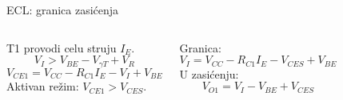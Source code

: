 \begin{frame}[label=10-s085]{ECL: granica zasićenja}
\setlength{\abovedisplayskip}{4pt}\setlength{\belowdisplayskip}{4pt}\setlength{\abovedisplayshortskip}{3pt}\setlength{\belowdisplayshortskip}{3pt}
\begin{columns}[T,onlytextwidth]\centering \raggedright T1 provodi celu struju $I_E$.
\[V_I>V_{BE}-V_{\gamma T}+V_R\]
\[V_{CE1}=V_{CC}-R_{C1}I_E-V_I+V_{BE}\]
Aktivan režim: $V_{CE1}>V_{CES}$.\par\medskip
Granica:
\[V_I=V_{CC}-R_{C1}I_E-V_{CES}+V_{BE}\]
U zasićenju:
\[V_{O1}=V_I-V_{BE}+V_{CES}\]\end{columns}
\end{frame}
